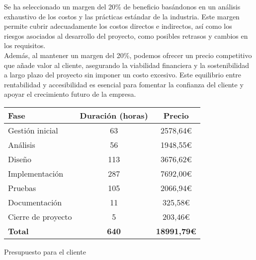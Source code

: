Se ha seleccionado un margen del 20\% de beneficio basándonos en un análisis exhaustivo de los costos y las prácticas estándar de la industria.
Este margen permite cubrir adecuadamente los costos directos e indirectos, así como los riesgos asociados al desarrollo del proyecto, como posibles retrasos y cambios en los requisitos.
\\[1ex]
Además, al mantener un margen del 20\%, podemos ofrecer un precio competitivo que añade valor al cliente, asegurando la viabilidad financiera y la sostenibilidad a largo plazo del proyecto sin imponer un costo excesivo.
Este equilibrio entre rentabilidad y accesibilidad es esencial para fomentar la confianza del cliente y apoyar el crecimiento futuro de la empresa.

\begin{planificacion}
	\centering
	\begin{tabular}{ | m{9cm} | c | c |}
		\hline
		\textbf{Fase}      & \textbf{Duración (horas)} & \textbf{Precio }   \\\hline
		Gestión inicial    & 63                        & 2578,64€           \\\hline
		Análisis           & 56                        & 1948,55€           \\\hline
		Diseño             & 113                       & 3676,62€           \\\hline
		Implementación     & 287                       & 7692,00€           \\\hline
		Pruebas            & 105                       & 2066,94€           \\\hline
		Documentación      & 11                        & 325,58€            \\\hline
		Cierre de proyecto & 5                         & 203,46€            \\\hline
		\textbf{Total}     & \textbf{640}              & \textbf{18991,79€} \\\hline
	\end{tabular}
	\caption{Presupuesto para el cliente}
\end{planificacion}

